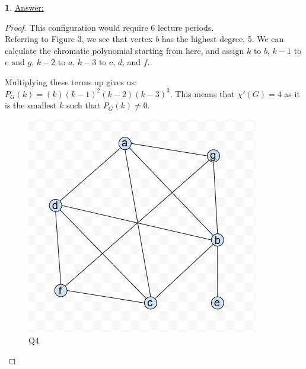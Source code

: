 \documentclass[12pt,a4paper]{article}
\theoremstyle{definition}
\newtheorem{problem}{}
\begin{document}
\begin{problem} \underline{Answer:}
\begin{proof} 
This configuration would require 6 lecture periods. \\

Referring to Figure 3, we see that vertex $b$ has the highest degree, 5. We can calculate the chromatic polynomial starting from here, and assign $k$ to $b$, $k - 1$ to $e$ and $g$, $k - 2$ to $a$, $k - 3$ to $c$, $d$, and $f$.

Multiplying these terms up gives us: $P_G(k) = (k)(k - 1)^2(k - 2)(k - 3)^3$. This means that $\chi'(G) = 4$ as it is the smallest $k$ such that $P_G(k) \neq 0$.

\begin{figure}[H]
    \centering
    \includegraphics[scale=0.5]{q4.png}
    \caption{Q4}
    \label{fig:my_label}
\end{figure}
\end{proof}
\end{problem}
\end{document}

